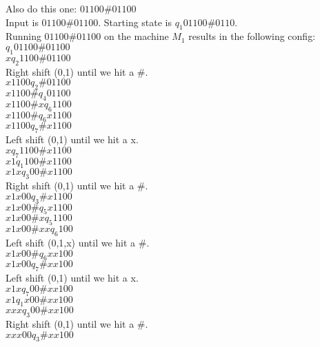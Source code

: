 \documentclass[12pt]{article}
\begin{document}
\pagebreak
Also do this one: $01100\#01100$ \\

Input is $01100\#01100$. Starting state is $q_1 01100\#0110$. \\
Running $01100\#01100$ on the machine $M_1$ results in the following config: \\

$                     q_1 01100 \# 01100$ \\
$x                    q_2  1100 \# 01100$ \\
Right shift (0,1) until we hit a $\#$.  \\
$x1100                q_2       \# 01100$ \\
$x1100 \#             q_4          01100$ \\
$x1100 \# x           q_6           1100$ \\
$x1100 \#             q_6          x1100$ \\
$x1100                q_7       \# x1100$ \\
Left shift (0,1) until we hit a x.      \\
$x                    q_7  1100 \# x1100$ \\
$x1                   q_1   100 \# x1100$ \\
$x1x                  q_3    00 \# x1100$ \\
Right shift (0,1) until we hit a $\#$.  \\
$x1x00                q_3       \# x1100$ \\
$x1x00 \#             q_5          x1100$ \\
$x1x00 \# x           q_5           1100$ \\
$x1x00 \# xx          q_6            100$ \\
Left shift (0,1,x) until we hit a $\#$.  \\
$x1x00 \#             q_6          xx100$ \\
$x1x00                q_7       \# xx100$ \\
Left shift (0,1) until we hit a x.        \\
$x1x                  q_7    00 \# xx100$ \\
$x1                   q_1   x00 \# xx100$ \\
$xxx                  q_3    00 \# xx100$ \\
Right shift (0,1) until we hit a $\#$.  \\
$xxx00                q_3       \# xx100$ \\
\end{document}
